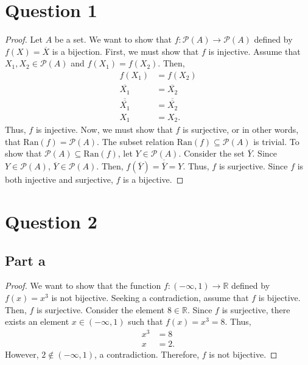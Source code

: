 \documentclass{article}
\begin{document}
\section*{Question 1}
\begin{proof}
Let $A$ be a set. We want to show that $f: \mathcal{P}(A) \to \mathcal{P}(A)$ defined by $f(X) = \overline{X}$ is a bijection. 
First, we must show that $f$ is injective.
Assume that $X_1, X_2 \in \mathcal{P}(A)$ and $f(X_1) = f(X_2)$. 
Then,
\begin{align*}
    f(X_1) &= f(X_2) \\
    \overline{X_1} &= \overline{X_2} \\
    \overline{\overline{X_1}} &= \overline{\overline{X_2}} \\
    X_1 &= X_2.
\end{align*}
Thus, $f$ is injective.
Now, we must show that $f$ is surjective, or in other words, that $\text{Ran}(f) = \mathcal{P}(A)$.
The subset relation $\text{Ran}(f) \subseteq \mathcal{P}(A)$ is trivial.
To show that $\mathcal{P}(A) \subseteq \text{Ran}(f)$, let $Y \in \mathcal{P}(A)$.
Consider the set $\overline{Y}$.
Since $Y \in \mathcal{P}(A)$, $\overline{Y} \in \mathcal{P}(A)$.
Then, $f(\overline{Y}) = \overline{\overline{Y}} = Y$.
Thus, $f$ is surjective.
Since $f$ is both injective and surjective, $f$ is a bijective.
\end{proof}

\section*{Question 2}

\subsection*{Part a}
\begin{proof}
We want to show that the function $f: (-\infty, 1) \to \mathbb{R}$ defined by $f(x) = x^3$ is not bijective.
Seeking a contradiction, assume that $f$ is bijective.
Then, $f$ is surjective.
Consider the element $8 \in \mathbb{R}$.
Since $f$ is surjective, there exists an element $x \in (-\infty, 1)$ such that $f(x) = x^3 = 8$.
Thus,
\begin{align*}
    x^3 &= 8 \\
    x &= 2.
\end{align*}
However, $2 \notin (-\infty, 1)$, a contradiction.
Therefore, $f$ is not bijective.
\end{proof}
\end{document}

